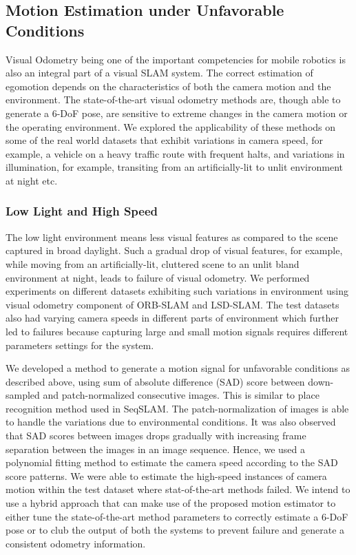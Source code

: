 \documentclass{article}
\begin{document}
\subsection{Motion Estimation under Unfavorable Conditions}
Visual Odometry being one of the important competencies for mobile robotics is also an integral part of a visual SLAM system. The correct estimation of egomotion depends on the characteristics of both the camera motion and the environment. The state-of-the-art visual odometry methods are, though able to generate a 6-DoF pose, are sensitive to extreme changes in the camera motion or the operating environment. We explored the applicability of these methods on some of the real world datasets that exhibit variations in camera speed, for example, a vehicle on a heavy traffic route with frequent halts, and variations in illumination, for example, transiting from an artificially-lit to unlit environment at night etc.

\subsubsection{Low Light and High Speed}
The low light environment means less visual features as compared to the scene captured in broad daylight. Such a gradual drop of visual features, for example, while moving from an artificially-lit, cluttered scene to an unlit bland environment at night, leads to failure of visual odometry. We performed experiments on different datasets exhibiting such variations in environment using visual odometry component of ORB-SLAM and LSD-SLAM. The test datasets also had varying camera speeds in different parts of environment which further led to failures because capturing large and small motion signals requires different parameters settings for the system.

We developed a method to generate a motion signal for unfavorable conditions as described above, using sum of absolute difference (SAD) score between down-sampled and patch-normalized consecutive images. This is similar to place recognition method used in SeqSLAM. The patch-normalization of images is able to handle the variations due to environmental conditions. It was also observed that SAD scores between images drops gradually with increasing frame separation between the images in an image sequence. Hence, we used a polynomial fitting method to estimate the camera speed according to the SAD score patterns. We were able to estimate the high-speed instances of camera motion within the test dataset where stat-of-the-art methods failed. We intend to use a hybrid approach that can make use of the proposed motion estimator to either tune the state-of-the-art method parameters to correctly estimate a 6-DoF pose or to club the output of both the systems to prevent failure and generate a consistent odometry information.
\end{document}
